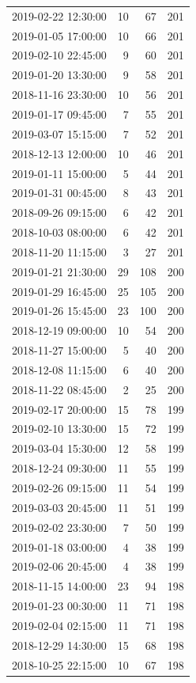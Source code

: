 \begin{tabular}{lrrr}
2019-02-22 12:30:00 & 10 & 67 & 201 \\
2019-01-05 17:00:00 & 10 & 66 & 201 \\
2019-02-10 22:45:00 & 9 & 60 & 201 \\
2019-01-20 13:30:00 & 9 & 58 & 201 \\
2018-11-16 23:30:00 & 10 & 56 & 201 \\
2019-01-17 09:45:00 & 7 & 55 & 201 \\
2019-03-07 15:15:00 & 7 & 52 & 201 \\
2018-12-13 12:00:00 & 10 & 46 & 201 \\
2019-01-11 15:00:00 & 5 & 44 & 201 \\
2019-01-31 00:45:00 & 8 & 43 & 201 \\
2018-09-26 09:15:00 & 6 & 42 & 201 \\
2018-10-03 08:00:00 & 6 & 42 & 201 \\
2018-11-20 11:15:00 & 3 & 27 & 201 \\
2019-01-21 21:30:00 & 29 & 108 & 200 \\
2019-01-29 16:45:00 & 25 & 105 & 200 \\
2019-01-26 15:45:00 & 23 & 100 & 200 \\
2018-12-19 09:00:00 & 10 & 54 & 200 \\
2018-11-27 15:00:00 & 5 & 40 & 200 \\
2018-12-08 11:15:00 & 6 & 40 & 200 \\
2018-11-22 08:45:00 & 2 & 25 & 200 \\
2019-02-17 20:00:00 & 15 & 78 & 199 \\
2019-02-10 13:30:00 & 15 & 72 & 199 \\
2019-03-04 15:30:00 & 12 & 58 & 199 \\
2018-12-24 09:30:00 & 11 & 55 & 199 \\
2019-02-26 09:15:00 & 11 & 54 & 199 \\
2019-03-03 20:45:00 & 11 & 51 & 199 \\
2019-02-02 23:30:00 & 7 & 50 & 199 \\
2019-01-18 03:00:00 & 4 & 38 & 199 \\
2019-02-06 20:45:00 & 4 & 38 & 199 \\
2018-11-15 14:00:00 & 23 & 94 & 198 \\
2019-01-23 00:30:00 & 11 & 71 & 198 \\
2019-02-04 02:15:00 & 11 & 71 & 198 \\
2018-12-29 14:30:00 & 15 & 68 & 198 \\
2018-10-25 22:15:00 & 10 & 67 & 198 \\

\end{tabular}
